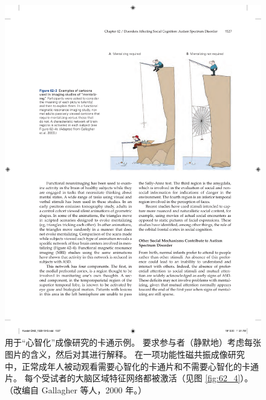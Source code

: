 \begin{figure}[htbp]
	\centering
	\includegraphics[width=0.7\linewidth]{chap62/fig_62_3}
	\caption{用于“心智化”成像研究的卡通示例。 要求参与者（静默地）考虑每张图片的含义，然后对其进行解释。 在一项功能性磁共振成像研究中，正常成年人被动观看需要心智化的卡通片和不需要心智化的卡通片。 每个受试者的大脑区域特征网络都被激活（见图 \ref{fig:62_4}）。 （改编自 Gallagher 等人，2000 年。）}
	\label{fig:62_3}
\end{figure}

